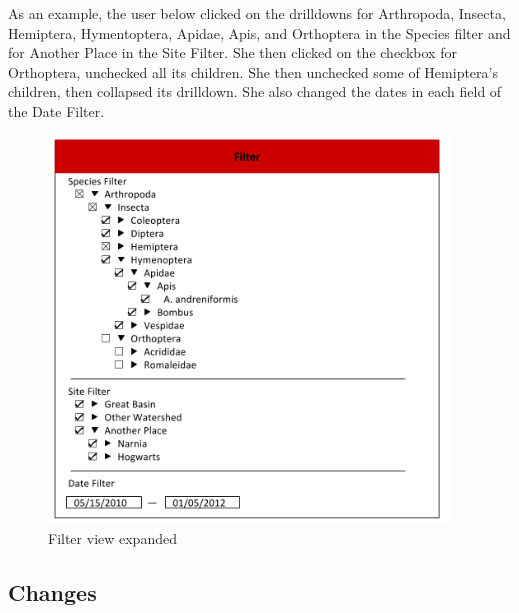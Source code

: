 As an example, the user below clicked on the drilldowns for Arthropoda, Insecta, Hemiptera, Hymentoptera, Apidae, Apis, and Orthoptera in the Species filter and for Another Place in the Site Filter. She then clicked on the checkbox for Orthoptera, unchecked all its children. She then unchecked some of Hemiptera’s children, then collapsed its drilldown. She also changed the dates in each field of the Date Filter.

\begin{figure}[h]
	\centering
	\includegraphics[width=0.95\textwidth]{filterinuse.png}
	\captionsetup{justification=centering}
	\caption{
		Filter view expanded
	}
	\label{fig:filter_mockup_in_use}
\end{figure}

\subsection{Changes}


